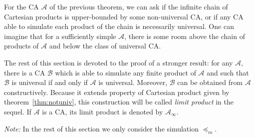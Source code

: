 \documentclass[a4paper]{elsarticle}
\newcommand{\ACA}{\mathcal{A}}
\newcommand{\ACB}{\mathcal{B}}
\newcommand{\simu}{\preccurlyeq}
\newcommand{\facsacsimu}{\simu_m}
\newcommand{\limprod}[1]{{\ACA}_\infty}
\begin{document}
For the CA $\ACA$ of the previous theorem, we can ask if the infinite
chain of Cartesian products is upper-bounded by some non-universal CA, or
if any CA able to simulate each product of the chain is necessarily
universal. One can imagine that for a sufficiently simple $\ACA$,
there is some room above the chain of products of $\ACA$ and below the
class of universal CA.

The rest of this section is devoted to the proof of a stronger result:
for any $\ACA$, there is a CA $\ACB$ which is able to simulate any
finite product of $\ACA$ and such that $\ACB$ is universal if and only
if $\ACA$ is universal. Moreover, $\ACB$ can be obtained from $\ACA$
constructively. Because it extends property of Cartesian product given
by theorem~\ref{thm:notuniv}, this construction will be called
\emph{limit product} in the sequel. If $\ACA$ is a CA, its limit
product is denoted by $\limprod{\ACA}$.

\textit{Note: }In the rest of this section we only consider the
simulation $\facsacsimu$. 
\end{document}
